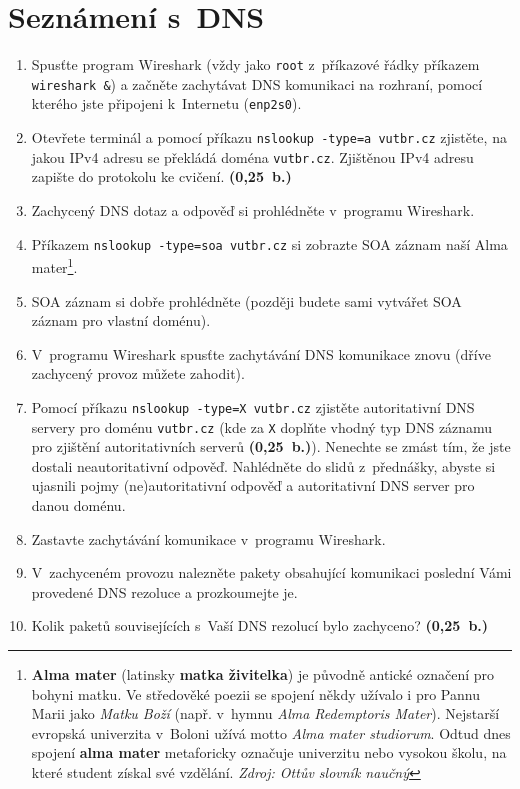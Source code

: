 \section{Seznámení s~DNS}
\begin{enumerate}
    \item Spusťte program Wireshark (vždy jako \texttt{root} z~příkazové řádky příkazem \texttt{wireshark \&}) a začněte zachytávat DNS komunikaci na rozhraní, pomocí kterého jste připojeni k~Internetu (\texttt{enp2s0}).
    \item Otevřete terminál a pomocí příkazu \texttt{nslookup -type=a vutbr.cz} zjistěte, na jakou IPv4 adresu se překládá doména \texttt{vutbr.cz}. Zjištěnou IPv4 adresu zapište do protokolu ke cvičení. \textbf{(0,25~b.)}
    \item Zachycený DNS dotaz a odpověď si prohlédněte v~programu Wireshark.
    \item Příkazem \texttt{nslookup -type=soa vutbr.cz} si zobrazte SOA záznam naší Alma mater\footnote{\textbf{Alma mater} (latinsky \textbf{matka živitelka}) je původně antické označení pro bohyni matku. Ve středověké poezii se spojení někdy užívalo i pro Pannu Marii jako \emph{Matku Boží} (např. v~hymnu \emph{Alma Redemptoris Mater}). Nejstarší evropská univerzita v~Boloni užívá motto \emph{Alma mater studiorum}. Odtud dnes spojení \textbf{alma mater} metaforicky označuje univerzitu nebo vysokou školu, na které student získal své vzdělání. \emph{Zdroj: Ottův slovník naučný}}.
    \item SOA záznam si dobře prohlédněte (později budete sami vytvářet SOA záznam pro vlastní doménu).
    \item V~programu Wireshark spusťte zachytávání DNS komunikace znovu (dříve zachycený provoz můžete zahodit).
    \item Pomocí příkazu \texttt{nslookup -type=X vutbr.cz} zjistěte autoritativní DNS servery pro doménu \texttt{vutbr.cz} (kde za \texttt{X} doplňte vhodný typ DNS záznamu pro zjištění autoritativních serverů \textbf{(0,25~b.)}). Nenechte se zmást tím, že jste dostali neautoritativní odpověď. Nahlédněte do slidů z~přednášky, abyste si ujasnili pojmy (ne)autoritativní odpověď a autoritativní DNS server pro danou doménu.
    \item Zastavte zachytávání komunikace v~programu Wireshark.
    \item V~zachyceném provozu nalezněte pakety obsahující komunikaci poslední Vámi provedené DNS rezoluce a prozkoumejte je.
    \item Kolik paketů souvisejících s~Vaší DNS rezolucí bylo zachyceno? \textbf{(0,25~b.)}

\end{enumerate}
